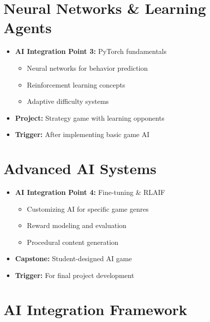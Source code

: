 \documentclass{article}
\begin{document}
\section{Neural Networks \& Learning Agents}
\begin{itemize}[nosep]
    \item \textbf{AI Integration Point 3:} PyTorch fundamentals
    \begin{itemize}
        \item Neural networks for behavior prediction
        \item Reinforcement learning concepts
        \item Adaptive difficulty systems
    \end{itemize}
    \item \textbf{Project:} Strategy game with learning opponents
    \item \textbf{Trigger:} After implementing basic game AI
\end{itemize}

\section{Advanced AI Systems}
\begin{itemize}[nosep]
    \item \textbf{AI Integration Point 4:} Fine-tuning \& RLAIF
    \begin{itemize}
        \item Customizing AI for specific game genres
        \item Reward modeling and evaluation
        \item Procedural content generation
    \end{itemize}
    \item \textbf{Capstone:} Student-designed AI game
    \item \textbf{Trigger:} For final project development
\end{itemize}

\section{AI Integration Framework}
\end{document}
